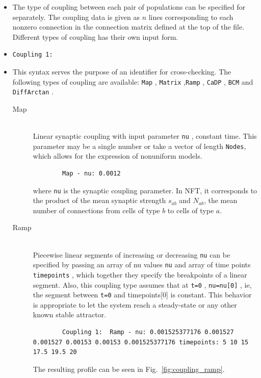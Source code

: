 \documentclass[12pt,a4paper]{article}
\newcommand{\type}[1]{{\small\small\tt #1} }
\begin{document}
\begin{itemize}

\item The type of coupling between each pair of populations can be specified for separately. The coupling data is given as $n$ lines  corresponding to each nonzero connection in the connection matrix defined at the top of the file. Different types of coupling has their own input form.
\item \begin{lstlisting}
Coupling 1:
\end{lstlisting}
\item This syntax serves the purpose of an identifier for cross-checking. The following types of coupling are available:  \type{Map},  \type{Matrix},\type{Ramp}, \type{CaDP}, \type{BCM} and \type{DiffArctan}.
\begin{description}

\item[Map]\ \\
    Linear synaptic coupling with input parameter \type{nu}, constant time.
    This parameter may be a single number or take a vector of length
    \texttt{Nodes}, which allows for the expression of nonuniform models.
    \begin{lstlisting}
        Map - nu: 0.0012
    \end{lstlisting}
    where \type{nu} is the synaptic coupling parameter. In NFT, it corresponds
    to the product of the mean synaptic strength $s_{ab}$ and $N_{ab}$, the
    mean number of connections from cells of type $b$ to cells of type $a$.


\item[Ramp]\ \\
    Piecewise linear segments of increasing or decreasing \type{nu} can be
    specified by passing an array of nu values \type{nu} and array of time
    points \type{timepoints}, which together they specify the breakpoints  of
    a linear segment. Also, this coupling type assumes that at \type{t=0},
    \type{nu=nu[0]}, ie, the segment between \type{t=0} and timepoints[0] is
    constant. This behavior is appropriate to let the system reach a steady-state 
    or any other known stable attractor.

    \begin{lstlisting}
        Coupling 1:  Ramp - nu: 0.001525377176 0.001527 0.001527 0.00153 0.00153 0.001525377176 timepoints: 5 10 15 17.5 19.5 20
    \end{lstlisting}
    The resulting profile can be seen in Fig.~\ref{fig:coupling_ramp}.


\end{description}
\end{itemize}
\end{document}
